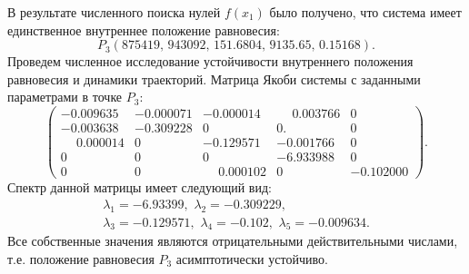 \documentclass[14pt,a4paper]{extarticle}
\begin{document}
\begin{example}
		В результате численного поиска нулей $f(x_1)$ было получено, что система имеет единственное внутреннее положение равновесия:
		\[P_3\left(875419,\,943092,\,151.6804,\,9135.65,\,0.15168\right).\]
		Проведем численное исследование устойчивости внутреннего положения равновесия и динамики траекторий. Матрица Якоби системы с заданными параметрами в точке $P_3$: 
		\[\begin{pmatrix}
			-0.009635&-0.000071&-0.000014& \phantom{-}0.003766&0\\
			-0.003638&-0.309228& 0       & 0.      & 0\\
			\phantom{-}0.000014& 0   &    -0.129571&-0.001766& 0\\
			0       & 0     &   0     &  -6.933988& 0\\
			0       & 0&\phantom{-}0.000102& 0   &   -0.102000 
		\end{pmatrix}.\]
		Спектр данной матрицы имеет следующий вид:
		\begin{multline*}
			\lambda_1=-6.93399,\,\, \lambda_2=-0.309229,\\
			\lambda_3=-0.129571,\,\, \lambda_4=-0.102,\,\, \lambda_5=-0.009634.
		\end{multline*}
		Все собственные значения являются отрицательными действительными числами, т.е. положение равновесия $P_3$ асимптотически устойчиво.
		\newpage
		\begin{figure}[h]
			\centering
			\\

\end{figure}
\end{example}
\end{document}
